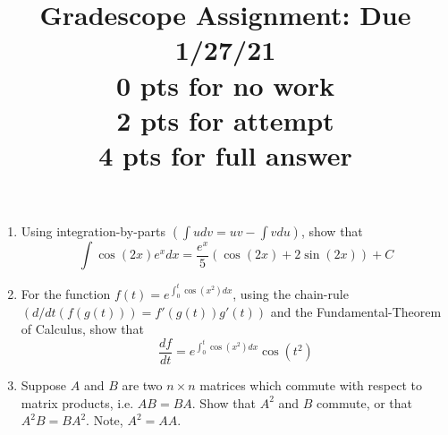 \documentclass[a4paper,11pt]{article}
\title{Gradescope Assignment: Due 1/27/21\\
0 pts for no work\\ 2 pts for attempt\\ 4 pts for full answer}
\date{}
\begin{document}
\maketitle
\begin{enumerate}
\item Using integration-by-parts $\left(\int udv = uv - \int vdu \right)$, show that 
\[
\int \cos(2x) e^{x}dx = \frac{e^{x}}{5}\left(\cos(2x) + 2\sin(2x) \right) + C
\]
\item For the function $f(t) = e^{\int_{0}^{t}\cos(x^2)dx}$, using the chain-rule $\left(d/dt(f(g(t)))=f'(g(t))g'(t)\right)$ and the Fundamental-Theorem of Calculus, show that 
\[
\frac{df}{dt} = e^{\int_{0}^{t}\cos(x^{2})dx}\cos(t^{2})
\] 
\item Suppose $A$ and $B$ are two $n\times n$ matrices which commute with respect to matrix products, i.e. $AB=BA$.  Show that $A^{2}$ and $B$ commute, or that $A^{2}B=BA^{2}$.  Note, $A^{2}=AA$.
\end{enumerate}
\end{document}
